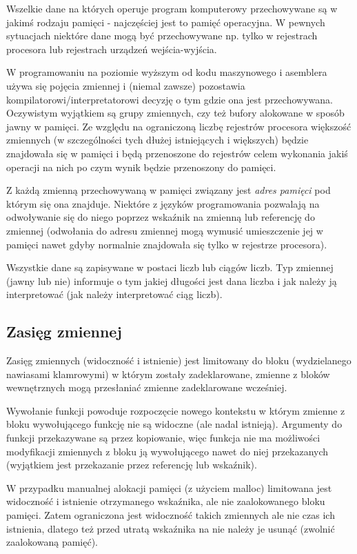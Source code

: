 \documentclass{pdfBooklets}
\begin{document}
Wszelkie dane na których operuje program komputerowy przechowywane są w jakimś rodzaju pamięci - najczęściej jest to pamięć operacyjna. W pewnych sytuacjach niektóre dane mogą być przechowywane np. tylko w rejestrach procesora lub rejestrach urządzeń wejścia-wyjścia.

W programowaniu na poziomie wyższym od kodu maszynowego i asemblera używa się pojęcia zmiennej i (niemal zawsze) pozostawia kompilatorowi/interpretatorowi decyzję o tym gdzie ona jest przechowywana. Oczywistym wyjątkiem są grupy zmiennych, czy też bufory alokowane w sposób jawny w pamięci. Ze względu na ograniczoną liczbę rejestrów procesora większość zmiennych (w szczególności tych dłużej istniejących i większych) będzie znajdowała się w pamięci i będą przenoszone do rejestrów celem wykonania jakiś operacji na nich po czym wynik będzie przenoszony do pamięci.

Z każdą zmienną przechowywaną w pamięci związany jest \emph{adres pamięci} pod którym się ona znajduje. Niektóre z języków programowania pozwalają na odwoływanie się do niego poprzez wskaźnik na zmienną lub referencję do zmiennej (odwołania do adresu zmiennej mogą wymusić umieszczenie jej w pamięci nawet gdyby normalnie znajdowała się tylko w rejestrze procesora).

Wszystkie dane są zapisywane w postaci liczb lub ciągów liczb. Typ zmiennej (jawny lub nie) informuje o tym jakiej długości jest dana liczba i jak należy ją interpretować (jak należy interpretować ciąg liczb). 

\subsection{Zasięg zmiennej}
Zasięg zmiennych (widoczność i istnienie) jest limitowany do bloku (wydzielanego nawiasami klamrowymi) w którym zostały zadeklarowane, zmienne z bloków wewnętrznych mogą przesłaniać zmienne zadeklarowane wcześniej.

Wywołanie funkcji powoduje rozpoczęcie nowego kontekstu w którym zmienne z bloku wywołującego funkcję nie są widoczne (ale nadal istnieją). Argumenty do funkcji przekazywane są przez kopiowanie, więc funkcja nie ma możliwości modyfikacji zmiennych z bloku ją wywołującego nawet do niej przekazanych (wyjątkiem jest przekazanie przez referencję lub wskaźnik).

W przypadku manualnej alokacji pamięci (z użyciem malloc) limitowana jest widoczność i istnienie otrzymanego wskaźnika, ale nie zaalokowanego bloku pamięci. Zatem ograniczona jest widoczność takich zmiennych ale nie czas ich istnienia, dlatego też przed utratą wskaźnika na nie należy je usunąć (zwolnić zaalokowaną pamięć). 
\end{document}
